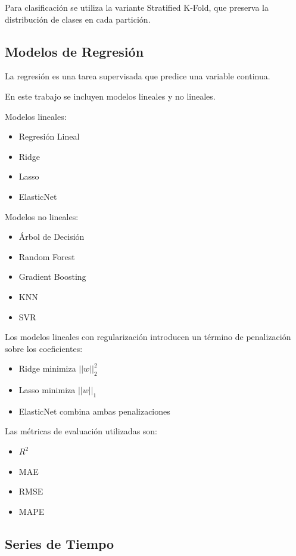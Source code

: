 \documentclass[12pt]{article}
\begin{document}
Para clasificación se utiliza la variante Stratified K-Fold, que preserva la distribución de clases en cada partición.

\subsection{Modelos de Regresión}

La regresión es una tarea supervisada que predice una variable continua.

En este trabajo se incluyen modelos lineales y no lineales.

Modelos lineales:

\begin{itemize}
\item Regresión Lineal
\item Ridge
\item Lasso
\item ElasticNet
\end{itemize}

Modelos no lineales:

\begin{itemize}
\item Árbol de Decisión
\item Random Forest
\item Gradient Boosting
\item KNN
\item SVR
\end{itemize}

Los modelos lineales con regularización introducen un término de penalización sobre los coeficientes:

\begin{itemize}
\item Ridge minimiza $||w||_2^2$
\item Lasso minimiza $||w||_1$
\item ElasticNet combina ambas penalizaciones
\end{itemize}

\cite{hastie2009elements}

Las métricas de evaluación utilizadas son:

\begin{itemize}
\item $R^2$
\item MAE
\item RMSE
\item MAPE
\end{itemize}

\subsection{Series de Tiempo}
\end{document}
